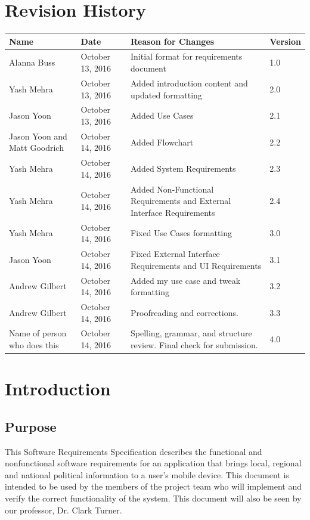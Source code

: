\documentclass[12pt,oneside,letterpaper]{article}
\newcounter{use_case}
\newcounter{functional_requirement}
\begin{document}
\section*{Revision History}
\begin{tabu}{|X[L.5]|l|X|l|}
  \hline
  \textbf{Name}&\textbf{Date}&\textbf{Reason for Changes}&\textbf{Version} \\
  \hline
  Alanna Buss & October 13, 2016 & Initial format for requirements document & 1.0 \\
  \hline
  Yash Mehra & October 13, 2016 & Added introduction content and updated formatting & 2.0 \\
  \hline
  Jason Yoon & October 13, 2016 & Added Use Cases & 2.1 \\
  \hline
  Jason Yoon and Matt Goodrich & October 14, 2016 & Added Flowchart & 2.2 \\
  \hline
  Yash Mehra & October 14, 2016 & Added System Requirements & 2.3 \\
  \hline
  Yash Mehra & October 14, 2016 & Added Non-Functional Requirements and External Interface Requirements & 2.4 \\
  \hline
  Yash Mehra & October 14, 2016 & Fixed Use Cases formatting & 3.0 \\
  \hline
  Jason Yoon & October 14, 2016 & Fixed External Interface Requirements and UI Requirements& 3.1 \\
  \hline
  Andrew Gilbert & October 14, 2016 & Added my use case and tweak formatting & 3.2 \\
  \hline
  Andrew Gilbert & October 14, 2016 & Proofreading and corrections. & 3.3\\
  \hline
  Name of person who does this & October 14, 2016 & Spelling, grammar, and structure review. Final check for submission. & 4.0 \\
  \hline
\end{tabu}

\newpage

\section{Introduction}
\subsection{Purpose}
This Software Requirements Specification describes the functional and
nonfunctional software requirements for an application that brings
local, regional and national political information to a user's mobile
device.  This document is intended to be used by the members of the
project team who will implement and verify the correct functionality
of the system. This document will also be seen by our professor,
Dr. Clark Turner.
\end{document}
